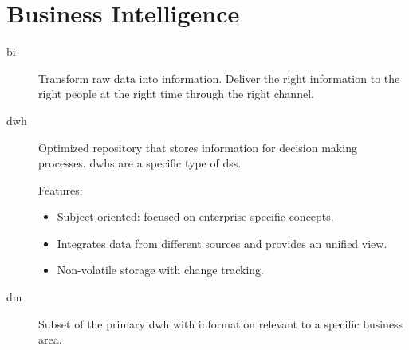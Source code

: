 \chapter{Business Intelligence}


\begin{description}
    \item[\Acl{bi}] 
        Transform raw data into information.
        Deliver the right information to the right people at the right time through the right channel.

    \item[\Ac{dwh}] 
        Optimized repository that stores information for decision making processes.
        \Acp{dwh} are a specific type of \ac{dss}.

        Features:
        \begin{itemize}
            \item Subject-oriented: focused on enterprise specific concepts.
            \item Integrates data from different sources and provides an unified view.
            \item Non-volatile storage with change tracking. 
        \end{itemize}

    \item[\Ac{dm}] 
        Subset of the primary \ac{dwh} with information relevant to a specific business area.
\end{description}